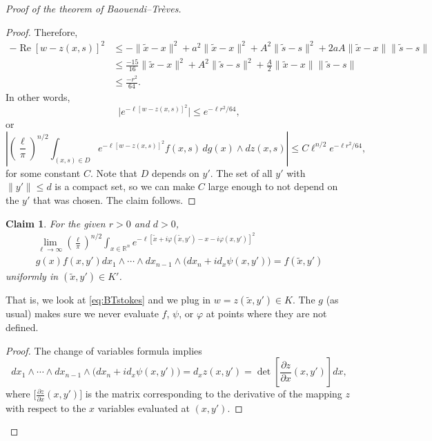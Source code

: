 \documentclass[12pt,openany]{book}
\renewcommand{\Re}{\operatorname{Re}}
\newcommand{\snorm}[1]{\lVert {#1} \rVert}
\newcommand{\babs}[1]{\bigl\lvert {#1} \bigr\rvert}
\newcommand{\abs}[1]{\left\lvert {#1} \right\rvert}
\newcommand{\R}{{\mathbb{R}}}
\theoremstyle{plain}
\newtheorem{claim}[thm]{Claim}
\theoremstyle{remark}
\theoremstyle{definition}
\theoremstyle{exercise}
\theoremstyle{example}
\begin{document}
\begin{proof}[Proof of the theorem of Baouendi--Tr{\`e}ves]
\begin{proof}
Therefore,
\begin{equation*}
\begin{split}
-\Re {[w - z(x,s)]}^2 & \leq
- \snorm{\tilde{x}-x}^2
+
a^2 \snorm{\tilde{x}-x}^2
+
A^2 \snorm{\tilde{s}-s}^2
+
2aA \snorm{\tilde{x}-x}\snorm{\tilde{s}-s}
\\
& \leq
\frac{-15}{16} \snorm{\tilde{x}-x}^2
+
A^2 \snorm{\tilde{s}-s}^2
+
\frac{A}{2} \snorm{\tilde{x}-x}\snorm{\tilde{s}-s}
\\
& \leq \frac{-r^2}{64} .
\end{split}
\end{equation*}
In other words,
\begin{equation*}
\babs{
e^{-\ell[w-z(x,s)]^2}}
\leq
e^{-\ell r^2  / 64} ,
\end{equation*}
or
\begin{equation*}
\abs{
{\left(\frac{\ell}{\pi}\right)}^{n/2}
\int_{(x,s)\in D}
e^{-\ell [w - z(x,s)]^2} f(x,s)
\,
dg(x)
\wedge
dz(x,s)
}
\leq
C
\ell^{n/2}
e^{-\ell r^2  / 64} ,
\end{equation*}
for some constant $C$.  Note that $D$ depends on $y'$.  The set of
all $y'$ with $\snorm{y'} \leq d$
is a compact set, so we can make $C$
large enough to not depend on the $y'$ that was chosen.
The claim follows.
\end{proof}

\begin{claim}
For the given $r>0$ and $d>0$,
\begin{multline*}
\lim_{\ell\to\infty}
{\left(\frac{\ell}{\pi}\right)}^{n/2}
\int_{x \in \R^n}
e^{  -\ell [\tilde{x}+i\varphi(\tilde{x},y') - x-i\varphi(x,y')]^2 }
\\
g(x) f(x,y')
dx_1  \wedge
\cdots \wedge
dx_{n-1}
\wedge
\bigl(dx_{n} + i d_x \psi (x,y') \bigr)
= f(\tilde{x},y')
\end{multline*}
uniformly in $(\tilde{x},y') \in K'$.
\end{claim}

That is, we look at \eqref{eq:BTstokes} and we plug in $w = z(\tilde{x},y') \in K$.
The $g$ (as usual) makes sure we never evaluate $f$, $\psi$, or
$\varphi$ at
points where they are not defined.

\begin{proof}
The change of variables formula implies
\begin{equation*}
dx_1  \wedge
\cdots \wedge
dx_{n-1}
\wedge
\bigl(dx_{n} + i d_x \psi (x,y') \bigr)
=
d_x z(x,y')
=
\det \left[\frac{\partial z}{\partial x}(x,y')\right] dx ,
\end{equation*}
where $\bigl[\frac{\partial z}{\partial x}(x,y')\bigr]$ is the matrix
corresponding to the derivative of the mapping $z$ with respect to the $x$
variables evaluated at $(x,y')$.


\end{proof}
\end{proof}
\end{document}
